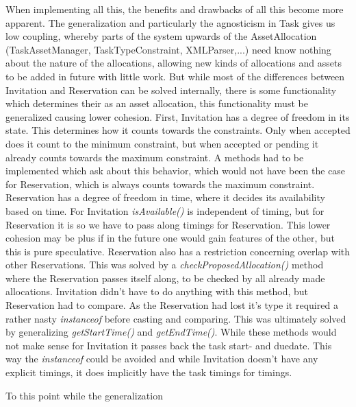 				When implementing all this, the benefits and drawbacks of all this become more apparent. The generalization and particularly the agnosticism in Task gives us low coupling, whereby parts of the system upwards of the AssetAllocation (TaskAssetManager, TaskTypeConstraint, XMLParser,...) need know nothing about the nature of the allocations, allowing new kinds of allocations and assets to be added in future with little work. But while most of the differences between Invitation and Reservation can be solved internally, there is some functionality which determines their as an asset allocation, this functionality must be generalized causing lower cohesion. First, Invitation has a degree of freedom in its state. This determines how it counts towards the constraints. Only when accepted does it count to the minimum constraint, but when accepted or pending it already counts towards the maximum constraint. A methods had to be implemented which ask about this behavior, which would not have been the case for Reservation, which is always counts towards the maximum constraint. Reservation has a degree of freedom in time, where it decides its availability based on time. For Invitation \emph{isAvailable()} is independent of timing, but for Reservation it is so we have to pass along timings for Reservation. This lower cohesion may be plus if in the future one would gain features of the other, but this is pure speculative. Reservation also has a restriction concerning overlap with other Reservations. This was solved by a \emph{checkProposedAllocation()} method where the Reservation passes itself along, to be checked by all already made allocations. Invitation didn't have to do anything with this method, but Reservation had to compare. As the Reservation had lost it's type it required a rather nasty \emph{instanceof} before casting and comparing. This was ultimately solved by generalizing \emph{getStartTime()} and \emph{getEndTime()}. While these methods would not make sense for Invitation it passes back the task start- and duedate. This way the \emph{instanceof} could be avoided and while Invitation doesn't have any explicit timings, it does implicitly have the task timings for timings. 

				To this point while the generalization 
				
				
				
		
		
		
		
	
